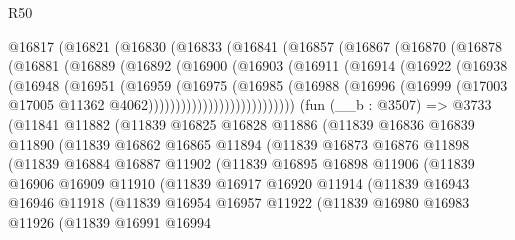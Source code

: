 \begin{lexlean}{R50}
\begin{coremodule}
    @16817
      (@16821
        (@16830
          (@16833
            (@16841
              (@16857
                (@16867
                  (@16870
                    (@16878
                      (@16881
                        (@16889
                          (@16892
                            (@16900
                              (@16903
                                (@16911
                                  (@16914
                                    (@16922
                                      (@16938
                                        (@16948
                                          (@16951
                                            (@16959
                                              (@16975
                                                (@16985
                                                  (@16988
                                                    (@16996
                                                      (@16999
                                                        (@17003
                                                          @17005
                                                          @11362
                                                          @4062)))))))))))))))))))))))))))
    (fun (__b : @3507) =>
    @3733
      (@11841
        @11882
        (@11839
          @16825
          @16828
          @11886
          (@11839
            @16836
            @16839
            @11890
            (@11839
              @16862
              @16865
              @11894
              (@11839
                @16873
                @16876
                @11898
                (@11839
                  @16884
                  @16887
                  @11902
                  (@11839
                    @16895
                    @16898
                    @11906
                    (@11839
                      @16906
                      @16909
                      @11910
                      (@11839
                        @16917
                        @16920
                        @11914
                        (@11839
                          @16943
                          @16946
                          @11918
                          (@11839
                            @16954
                            @16957
                            @11922
                            (@11839
                              @16980
                              @16983
                              @11926
                              (@11839
                                @16991
                                @16994

\end{coremodule}
\end{lexlean}
